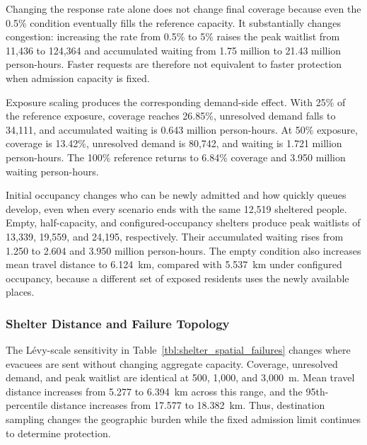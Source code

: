 Changing the response rate alone does not change final coverage because even the 0.5\% condition eventually fills the reference capacity. It substantially changes congestion: increasing the rate from 0.5\% to 5\% raises the peak waitlist from 11,436 to 124,364 and accumulated waiting from 1.75 million to 21.43 million person-hours. Faster requests are therefore not equivalent to faster protection when admission capacity is fixed.

Exposure scaling produces the corresponding demand-side effect. With 25\% of the reference exposure, coverage reaches 26.85\%, unresolved demand falls to 34,111, and accumulated waiting is 0.643 million person-hours. At 50\% exposure, coverage is 13.42\%, unresolved demand is 80,742, and waiting is 1.721 million person-hours. The 100\% reference returns to 6.84\% coverage and 3.950 million waiting person-hours.

Initial occupancy changes who can be newly admitted and how quickly queues develop, even when every scenario ends with the same 12,519 sheltered people. Empty, half-capacity, and configured-occupancy shelters produce peak waitlists of 13,339, 19,559, and 24,195, respectively. Their accumulated waiting rises from 1.250 to 2.604 and 3.950 million person-hours. The empty condition also increases mean travel distance to 6.124~km, compared with 5.537~km under configured occupancy, because a different set of exposed residents uses the newly available places.

\subsubsection{Shelter Distance and Failure Topology}

The L\'evy-scale sensitivity in Table~\ref{tbl:shelter_spatial_failures} changes where evacuees are sent without changing aggregate capacity. Coverage, unresolved demand, and peak waitlist are identical at 500, 1,000, and 3,000~m. Mean travel distance increases from 5.277 to 6.394~km across this range, and the 95th-percentile distance increases from 17.577 to 18.382~km. Thus, destination sampling changes the geographic burden while the fixed admission limit continues to determine protection.

